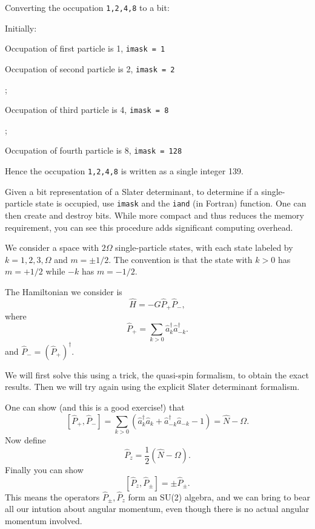\begin{small}
{\scriptsize

Converting the occupation {\tt 1,2,4,8} to a bit:

Initially:


Occupation of first particle is 1, {\tt imask = 1}


\bigskip

Occupation of second particle is 2, {\tt imask = 2}

;

\bigskip

Occupation of third particle is 4, {\tt imask = 8}

;

\bigskip

Occupation of fourth particle is 8, {\tt imask = 128}

Hence the occupation {\tt 1,2,4,8} is written as a single integer 139.

Given a bit representation of a Slater determinant, to determine if 
a single-particle state is occupied, use {\tt imask} and the 
{\tt iand} (in Fortran) function.
One can then create and destroy bits.
While more compact and thus reduces the memory requirement, 
you can see this procedure adds significant 
computing overhead.

We consider a space with $2\Omega$ single-particle states, with each 
state labeled by 
$k = 1, 2, 3, \Omega$ and $m = \pm 1/2$. The convention is that 
the state with $k>0$ has $m = + 1/2$ while $-k$ has $m = -1/2$.

\smallskip

The Hamiltonian we consider is 
\[
\hat{H} = -G \hat{P}_+ \hat{P}_-,
\]
where
\[
\hat{P}_+ = \sum_{k > 0} \hat{a}^\dagger_k \hat{a}^\dagger_{-{k}}.
\]
and $\hat{P}_- = ( \hat{P}_+)^\dagger$.

\bigskip

We will first solve this using a trick, the quasi-spin formalism, to obtain the 
exact results. Then we will try again using the explicit Slater determinant formalism.

One can show (and this is a good exercise!) that
\[
\left [ \hat{P}_+, \hat{P}_- \right ] = \sum_{k> 0} \left( \hat{a}^\dagger_k \hat{a}_k 
+ \hat{a}^\dagger_{-{k}} \hat{a}_{-{k}} - 1 \right) = \hat{N} - \Omega.
\]
Now define 
\[
\hat{P}_z = \frac{1}{2} ( \hat{N} -\Omega).
\]
Finally you can show
\[
\left [ \hat{P}_z , \hat{P}_\pm \right ] = \pm \hat{P}_\pm.
\]
This means the operators $\hat{P}_\pm, \hat{P}_z$ form an SU(2) algebra, and we can 
bring to bear all our intution about angular momentum, even though there is no actual 
angular momentum involved. 

}
\end{small}

